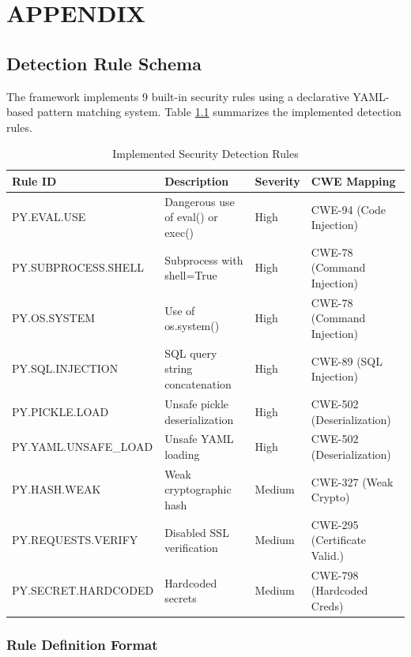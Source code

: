 \appendix

\chapter{\uppercase{Appendix}}
\label{appendix:implementation}

\section{Detection Rule Schema}

The framework implements 9 built-in security rules using a declarative YAML-based pattern matching system. Table \ref{tab:rules-implemented} summarizes the implemented detection rules.

\begin{table}[H]
\centering
\caption{Implemented Security Detection Rules}
\label{tab:rules-implemented}
\footnotesize
\begin{tabular}{|l|p{5cm}|l|p{3.5cm}|}
\hline
\textbf{Rule ID} & \textbf{Description} & \textbf{Severity} & \textbf{CWE Mapping} \\
\hline
PY.EVAL.USE & Dangerous use of eval() or exec() & High & CWE-94 (Code Injection) \\
\hline
PY.SUBPROCESS.SHELL & Subprocess with shell=True & High & CWE-78 (Command Injection) \\
\hline
PY.OS.SYSTEM & Use of os.system() & High & CWE-78 (Command Injection) \\
\hline
PY.SQL.INJECTION & SQL query string concatenation & High & CWE-89 (SQL Injection) \\
\hline
PY.PICKLE.LOAD & Unsafe pickle deserialization & High & CWE-502 (Deserialization) \\
\hline
PY.YAML.UNSAFE\_LOAD & Unsafe YAML loading & High & CWE-502 (Deserialization) \\
\hline
PY.HASH.WEAK & Weak cryptographic hash & Medium & CWE-327 (Weak Crypto) \\
\hline
PY.REQUESTS.VERIFY & Disabled SSL verification & Medium & CWE-295 (Certificate Valid.) \\
\hline
PY.SECRET.HARDCODED & Hardcoded secrets & Medium & CWE-798 (Hardcoded Creds) \\
\hline
\end{tabular}
\end{table}

\subsection{Rule Definition Format}

